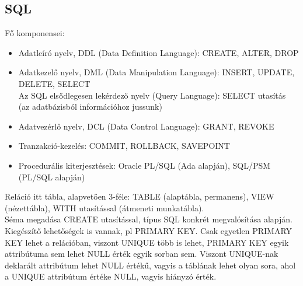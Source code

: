 \documentclass[margin=0px]{article}
\begin{document}
	\subsection{SQL}
	
	Fő komponensei:
	\begin{itemize}
		\item Adatleíró nyelv, DDL (Data Definition Language): CREATE, ALTER, DROP
		\item Adatkezelő nyelv, DML (Data Manipulation Language): INSERT, UPDATE, DELETE, SELECT \\
		Az SQL elsődlegesen lekérdező nyelv (Query Language): SELECT utasítás (az adatbázisból információhoz jussunk)
		\item Adatvezérlő nyelv, DCL (Data Control Language): GRANT, REVOKE
		\item Tranzakció-kezelés: COMMIT, ROLLBACK, SAVEPOINT
		\item Procedurális kiterjesztések: Oracle PL/SQL (Ada alapján), SQL/PSM (PL/SQL alapján)
	\end{itemize}
	Reláció itt tábla, alapvetően 3-féle: TABLE (alaptábla, permanens), VIEW (nézettábla), WITH utasítással (átmeneti munkatábla).\\
	Séma megadása CREATE utasítással, típus SQL konkrét megvalósítása alapján. Kiegészítő lehetőségek is vannak, pl PRIMARY KEY. Csak egyetlen PRIMARY KEY lehet a relációban, viszont UNIQUE több is lehet, PRIMARY KEY egyik attribútuma sem lehet NULL érték egyik sorban sem. Viszont UNIQUE-nak deklarált attribútum lehet NULL értékű, vagyis a táblának lehet olyan sora, ahol a UNIQUE attribútum értéke NULL, vagyis hiányzó érték. \\ \\
	
\end{document}
